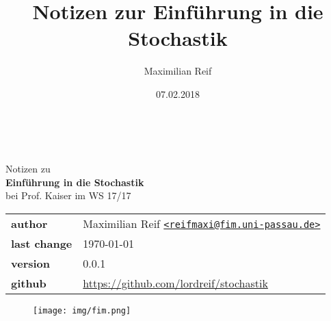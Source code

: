 \documentclass[11pt,a4paper,ngerman]{article}
\date{07.02.2018}
\author{Maximilian Reif}
\title{Notizen zur Einführung in die Stochastik}
\begin{document}
\begin{titlepage}
    \ \newline\newline\newline\newline\newline
	
	\begin{center}

		\huge Notizen zu\\
		\Huge\textbf{Einführung in die Stochastik}\\
		\huge bei Prof. Kaiser im WS 17/17\\
		\normalsize

		\vspace{1cm}
		\begin{tabular}[b]{l|l}
			\textbf{author} 		& Maximilian Reif
			\texttt{\href{mailto:reifmaxi@fim.uni-passau.de}
			{<reifmaxi@fim.uni-passau.de>}}\\
			\textbf{last change}	& \today \\
			\textbf{version} 	& 0.0.1\\
			\textbf{github} 		& \url{https://github.com/lordreif/stochastik}
		\end{tabular}
		\vspace{1cm}
		
	\end{center}
	
	\begin{figure}[b]
	\centering
	\texttt{[image: img/fim.png]}
	\end{figure}
	
\end{titlepage}

%

\newpage
\newpage

\setcounter{page}{1}

%
%
%
\end{document}
